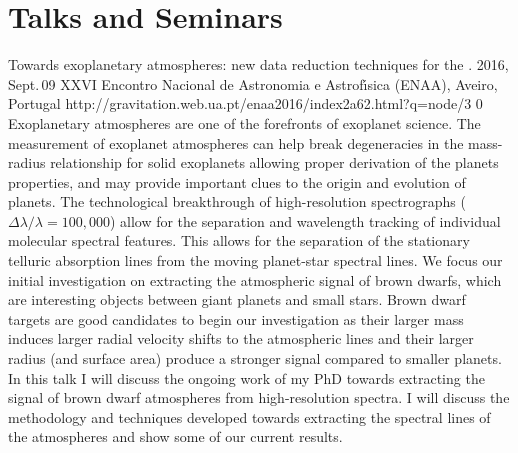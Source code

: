 \section{Talks and Seminars}\label{appsec:talks}

{Towards exoplanetary atmospheres: new data reduction techniques for the \nir{}.} %
{2016, Sept.\,09}%
{XXVI Encontro Nacional de Astronomia e Astrof\'{\i}sica (ENAA), Aveiro, Portugal}%
{http://gravitation.web.ua.pt/enaa2016/index2a62.html?q=node/3}%
{0}%
{Exoplanetary atmospheres are one of the forefronts of exoplanet science.
The measurement of exoplanet atmospheres can help break degeneracies in the mass-radius relationship for solid exoplanets allowing proper derivation of the planets properties, and may provide important clues to the origin and evolution of planets.
The technological breakthrough of high-resolution spectrographs ($\Delta \lambda / \lambda = 100,000$) allow for the separation and wavelength tracking of individual molecular spectral features.
This allows for the separation of the stationary telluric absorption lines from the moving planet-star spectral lines.
We focus our initial investigation on extracting the atmospheric signal of brown dwarfs, which are interesting objects between giant planets and small stars.
Brown dwarf targets are good candidates to begin our investigation as their larger mass induces larger radial velocity shifts to the atmospheric lines and their larger radius (and surface area) produce a stronger signal compared to smaller planets.
In this talk I will discuss the ongoing work of my PhD towards extracting the signal of brown dwarf atmospheres from high-resolution \nir{}spectra.
I will discuss the methodology and techniques developed towards extracting the spectral lines of the atmospheres and show some of our current results.}%


